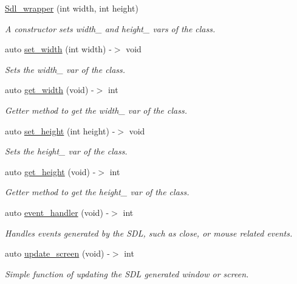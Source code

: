 \begin{DoxyCompactItemize}
\item 
\hyperlink{class_sdl__wrapper_acf14e52267a3795ef781b892ce71a774}{Sdl\+\_\+wrapper} (int width, int height)
\begin{DoxyCompactList}\small\item\em A constructor sets width\+\_\+ and height\+\_\+ vars of the class. \end{DoxyCompactList}\item 
auto \hyperlink{class_sdl__wrapper_a4485abe35d9b1ced9a88582098a9665e}{set\+\_\+width} (int width) -\/$>$ void
\begin{DoxyCompactList}\small\item\em Sets the width\+\_\+ var of the class. \end{DoxyCompactList}\item 
auto \hyperlink{class_sdl__wrapper_ab1624c7f5d81d471c5b4d34314424fc7}{get\+\_\+width} (void) -\/$>$ int
\begin{DoxyCompactList}\small\item\em Getter method to get the width\+\_\+ var of the class. \end{DoxyCompactList}\item 
auto \hyperlink{class_sdl__wrapper_aaabe5fb6202226945dc1031ac0cb2f00}{set\+\_\+height} (int height) -\/$>$ void
\begin{DoxyCompactList}\small\item\em Sets the height\+\_\+ var of the class. \end{DoxyCompactList}\item 
auto \hyperlink{class_sdl__wrapper_af339b021ecc8d0860b902dfb9829ec90}{get\+\_\+height} (void) -\/$>$ int
\begin{DoxyCompactList}\small\item\em Getter method to get the height\+\_\+ var of the class. \end{DoxyCompactList}\item 
auto \hyperlink{class_sdl__wrapper_a63ec0ab56f9614f2b7a1d78a3c6fc78f}{event\+\_\+handler} (void) -\/$>$ int
\begin{DoxyCompactList}\small\item\em Handles events generated by the S\+DL, such as close, or mouse related events. \end{DoxyCompactList}\item 
auto \hyperlink{class_sdl__wrapper_ab86794b59ee7cadeb5df8ae703f4d2dd}{update\+\_\+screen} (void) -\/$>$ int
\begin{DoxyCompactList}\small\item\em Simple function of updating the S\+DL generated window or screen. \end{DoxyCompactList}\item 

\end{DoxyCompactItemize}
